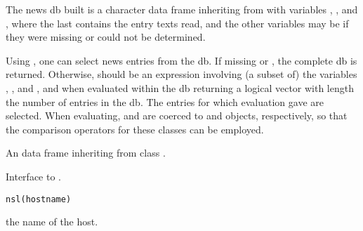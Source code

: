 \begin{Details}
The news db built is a character data frame inheriting from
 with variables , ,
 and , where the last contains the entry texts
read, and the other variables may be  if they were missing or
could not be determined.

Using , one can select news entries from the db.  If
missing or , the complete db is returned.  Otherwise,
 should be an expression involving (a subset of) the
variables , ,  and
, and when evaluated within the db returning a logical
vector with length the number of entries in the db.  The entries for
which evaluation gave  are selected.  When evaluating,
 and  are coerced to
 and  objects,
respectively, so that the comparison operators for these classes can
be employed.
\end{Details}
%
\begin{Value}
An data frame inheriting from class .
\end{Value}
%
\begin{Examples}
\end{Examples}
%
\begin{Description}\relax
Interface to .
\end{Description}
%
\begin{Usage}
\begin{verbatim}
nsl(hostname)
\end{verbatim}
\end{Usage}
%
\begin{Arguments}
\begin{ldescription}
\item[\code{hostname}] the name of the host.
\end{ldescription}
\end{Arguments}
